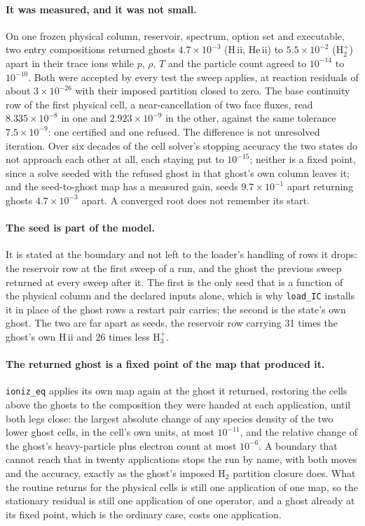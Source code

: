 \documentclass[english,a4paper]{my_memo}
\begin{document}
\paragraph{It was measured, and it was not small.} On one frozen physical
column, reservoir, spectrum, option set and executable, two entry
compositions returned ghosts $4.7\times10^{-3}$ (H\,{\sc ii}, He\,{\sc ii})
to $5.5\times10^{-2}$ (H$_2^+$) apart in their trace ions while $p$, $\rho$,
$T$ and the particle count agreed to $10^{-14}$ to $10^{-10}$. Both were
accepted by every test the sweep applies, at reaction residuals of about
$3\times10^{-26}$ with their imposed partition closed to zero. The base
continuity row of the first physical cell, a near-cancellation of two face
fluxes, read $8.335\times10^{-8}$ in one and $2.923\times10^{-9}$ in the
other, against the same tolerance $7.5\times10^{-9}$: one certified and one
refused. The difference is not unresolved iteration. Over six decades of the
cell solver's stopping accuracy the two states do not approach each other at
all, each staying put to $10^{-15}$; neither is a fixed point, since a solve
seeded with the refused ghost in that ghost's own column leaves it; and the
seed-to-ghost map has a measured gain, seeds $9.7\times10^{-1}$ apart
returning ghosts $4.7\times10^{-3}$ apart. A converged root does not remember
its start.

\paragraph{The seed is part of the model.} It is stated at the boundary and
not left to the loader's handling of rows it drops: the reservoir row at the
first sweep of a run, and the ghost the previous sweep returned at every
sweep after it. The first is the only seed that is a function of the physical
column and the declared inputs alone, which is why \texttt{load\_IC}
installs it in place of the ghost rows a restart pair carries; the second is
the state's own ghost. The two are far apart as seeds, the reservoir row
carrying 31 times the ghost's own H\,{\sc ii} and 26 times less H$_3^+$.

\paragraph{The returned ghost is a fixed point of the map that produced it.}
\texttt{ioniz\_eq} applies its own map again at the ghost it returned,
restoring the cells above the ghosts to the composition they were handed at
each application, until both legs close: the largest absolute change of any
species density of the two lower ghost cells, in the cell's own units, at
most $10^{-11}$, and the relative change of the ghost's heavy-particle plus
electron count at most $10^{-6}$. A boundary that cannot reach that in twenty
applications stops the run by name, with both moves and the accuracy, exactly
as the ghost's imposed H$_2$ partition closure does. What the routine returns
for the physical cells is still one application of one map, so the stationary
residual is still one application of one operator, and a ghost already at its
fixed point, which is the ordinary case, costs one application.
\end{document}
